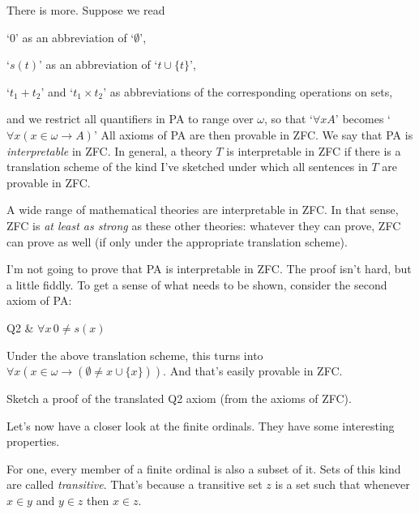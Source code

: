 There is more.
Suppose we read
\begin{itemize*}
  \item `$0$' as an abbreviation of `$\emptyset$',
  \item `$s(t)$' as an abbreviation of `$t \cup \{ t \}$',
  \item `$t_{1} + t_{2}$' and `$t_{1} \times t_{2}$' as abbreviations of the corresponding operations on sets,
\end{itemize*}
and we restrict all quantifiers in PA to range over $\omega$,
so that `$\forall x A$' becomes `$\forall x ({x \in \omega} \to A)$'
All axioms of PA are then provable in ZFC.
We say that PA is \textit{interpretable} in ZFC.
In general,
a theory $T$ is interpretable in ZFC if
there is a translation scheme of the kind I've sketched
under which all sentences in $T$ are provable in ZFC.

A wide range of mathematical theories are interpretable in ZFC.
In that sense,
ZFC is \emph{at least as strong} as these other theories:
whatever they can prove,
ZFC can prove as well
(if only under the appropriate translation scheme).


I'm not going to prove that PA is interpretable in ZFC.
The proof isn't hard,
but a little fiddly.
To get a sense of what needs to be shown,
consider the second axiom of PA:

\begin{axioms}
  Q2 & $\forall x \, 0\! \not= \!s(x)$
\end{axioms}

\noindent%
Under the above translation scheme,
this turns into $\forall x (x \in \omega  \to (\emptyset \ne x \cup \{ x \}))$.
And that's easily provable in ZFC.

\begin{exercise}
  Sketch a proof of the translated Q2 axiom (from the axioms of ZFC).
\end{exercise}


Let's now have a closer look at the finite ordinals.
They have some interesting properties.

For one,
every member of a finite ordinal is also a subset of it.
Sets of this kind are called \textit{transitive}.
That's because a transitive set $z$ is a set such that
whenever $x \in y$ and $y \in z$ then $x \in z$.

